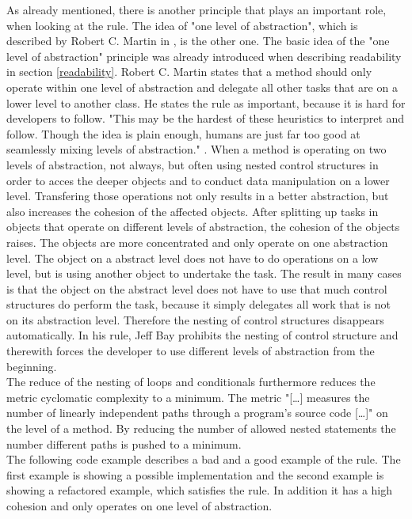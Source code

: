 As already mentioned, there is another principle that plays an important role, when looking at the rule. The idea of "one level of abstraction", which is described by Robert C. Martin in \cite{cc}, is the other one. The basic idea of the "one level of abstraction" principle was already introduced when describing readability in section \ref{readability}. Robert C. Martin states that a method should only operate within one level of abstraction and delegate all other tasks that are on a lower level to another class. He states the rule as important, because it is hard for developers to follow. "This may be the hardest of these heuristics to interpret and follow. Though the idea is plain enough, humans are just far too good at seamlessly mixing levels of abstraction." \cite{cc}. When a method is operating on two levels of abstraction, not always, but often using nested control structures in order to acces the deeper objects and to conduct data manipulation on a lower level. Transfering those operations not only results in a better abstraction, but also increases the cohesion of the affected objects. After splitting up tasks in objects that operate on different levels of abstraction, the cohesion of the objects raises. The objects are more concentrated and only operate on one abstraction level. The object on a abstract level does not have to do operations on a low level, but is using another object to undertake the task. The result in many cases is that the object on the abstract level does not have to use that much control structures do perform the task, because it simply delegates all work that is not on its abstraction level. Therefore the nesting of control structures disappears automatically. In his rule, Jeff Bay prohibits the nesting of control structure and therewith forces the developer to use different levels of abstraction from the beginning. 
\\

The reduce of the nesting of loops and conditionals furthermore reduces the metric cyclomatic complexity to a minimum. The metric "[\dots] measures the number of linearly independent paths through a program's source code [\dots]" \cite[Cyclomatic complexity]{wiki} on the level of a method. By reducing the number of allowed nested statements the number different paths is pushed to a minimum.
\\

The following code example describes a bad and a good example of the rule. The first example is showing a possible implementation and the second example is showing a refactored example, which satisfies the rule. In addition it has a high cohesion and only operates on one level of abstraction. 
\\

